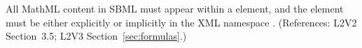 All MathML content in SBML must appear within a 
element, and the  element must be either explicitly or
implicitly in the XML namespace
.  (References: L2V2
Section~3.5; L2V3 Section~\ref{sec:formulas}.)
